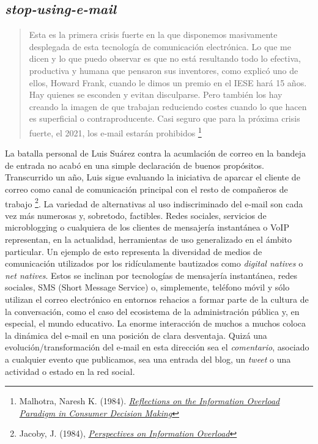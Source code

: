 \documentclass[12pt, a4paper,twoside]{book}
\begin{document}
\subsection{\emph{stop-using-e-mail}}

\begin{quote}
Esta es la primera crisis fuerte en la que disponemos masivamente
desplegada de esta tecnología de comunicación electrónica. Lo que
me dicen y lo que puedo observar es que no está resultando todo lo
efectiva, productiva y humana que pensaron sus inventores, como
explicó uno de ellos, Howard Frank, cuando le dimos un premio en el
IESE hará 15 años. Hay quienes se esconden y evitan disculparse.
Pero también los hay creando la imagen de que trabajan reduciendo
costes cuando lo que hacen es superficial o contraproducente. Casi
seguro que para la próxima crisis fuerte, el 2021, los e-mail
estarán prohibidos%
\footnote{Malhotra, Naresh K. (1984).
\emph{\href{http://www.jstor.org/pss/2488913}{Reflections on the Information Overload Paradigm in Consumer Decision Making}}}

\end{quote}
La batalla personal de Luis Suárez contra la acumlación de correo
en la bandeja de entrada no acabó en una simple declaración de
buenos propósitos. Transcurrido un año, Luis sigue evaluando la
iniciativa de aparcar el cliente de correo como canal de
comunicación principal con el resto de compañeros de trabajo%
\footnote{Jacoby, J. (1984),
\emph{\href{http://www.jstor.org/pss/2488912}{Perspectives on Information Overload}}}.
La variedad de alternativas al uso indiscriminado del e-mail son
cada vez más numerosas y, sobretodo, factibles. Redes sociales,
servicios de microblogging o cualquiera de los clientes de
mensajería instantánea o VoIP representan, en la actualidad,
herramientas de uso generalizado en el ámbito particular. Un
ejemplo de esto representa la diversidad de medios de comunicación
utilizados por los ridículamente bautizados como
\emph{digital natives} o \emph{net natives}. Estos se inclinan por
tecnologías de mensajería instantánea, redes sociales, SMS (Short
Message Service) o, simplemente, teléfono móvil y sólo utilizan el
correo electrónico en entornos rehacios a formar parte de la
cultura de la conversación, como el caso del ecosistema de la
administración pública y, en especial, el mundo educativo. La
enorme interacción de muchos a muchos coloca la dinámica del e-mail
en una posición de clara desventaja. Quizá una
evolución/transformación del e-mail en esta dirección sea el
\emph{comentario}, asociado a cualquier evento que publicamos, sea
una entrada del blog, un \emph{tweet} o una actividad o estado en
la red social.
\end{document}
